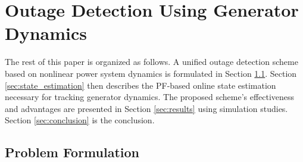 



\chapter{Outage Detection Using Generator Dynamics} %
\label{ch:detection_using_generator_dynamics}


The rest of this paper is organized as follows. A unified outage detection scheme based on nonlinear power system dynamics is formulated in Section \ref{sec:formulation}. Section \ref{sec:state_estimation} then describes the PF-based online state estimation necessary for tracking generator dynamics. The proposed scheme's effectiveness and advantages are presented in Section \ref{sec:results} using simulation studies. Section \ref{sec:conclusion} is the conclusion.


\section{Problem Formulation}
\label{sec:formulation}
